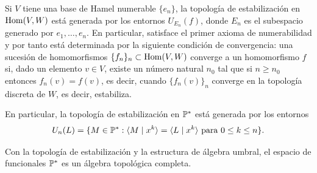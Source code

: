 Si $V$ tiene una base de Hamel numerable $\{e_{n}\}$, la topología de estabilización en $\operatorname*{Hom}(V,W)$ está generada por los entornos $U_{E_{n}}(f)$, donde $E_{n}$ es el subespacio generado por $e_{1}, \dots, e_{n}$. En particular, satisface el primer axioma de numerabilidad y por tanto está determinada por la siguiente condición de convergencia: una sucesión de homomorfismos $\{f_n\}_n \subset \operatorname*{Hom}(V,W)$ converge a un homomorfismo $f$ si, dado un elemento $v \in V$, existe un número natural $n_0$ tal que si $n \geq n_0$ entonces $f_n(v) = f(v)$, es decir, cuando $\{f_n(v)\}_{n}$ converge en la topología discreta de $W$, es decir, estabiliza.

En particular, la topología de estabilización en $\mathbb{P}^{*}$ está generada por los entornos
\[
	U_{n}(L) = \{M \in \mathbb{P}^{*} : \langle M \mid x^{k} \rangle = \langle L \mid x^{k} \rangle \text{ para } 0 \leq k \leq n \}.
\]




\begin{proposicion}\label{icu homeomorfismo}
    Con la topología de estabilización y la estructura de álgebra umbral, el espacio de funcionales $\mathbb{P}^*$ es un álgebra topológica completa.
\end{proposicion}

